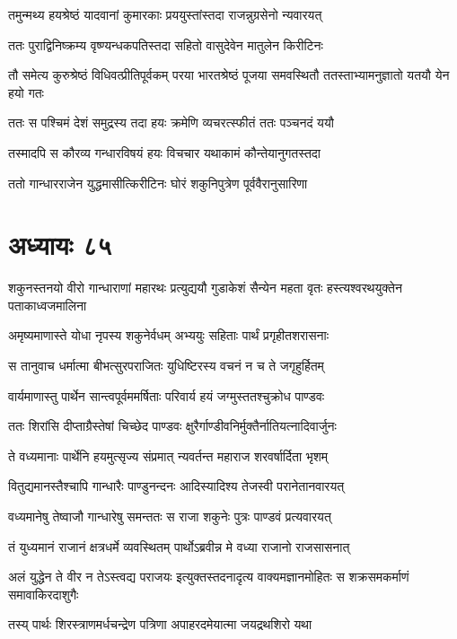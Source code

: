 \twolineshloka
{तमुन्मथ्य हयश्रेष्ठं यादवानां कुमारकाः}
{प्रययुस्तांस्तदा राजन्नुग्रसेनो न्यवारयत्}


\twolineshloka
{ततः पुराद्विनिष्क्रम्य वृष्ण्यन्धकपतिस्तदा}
{सहितो वासुदेवेन मातुलेन किरीटिनः}


\threelineshloka
{तौ समेत्य कुरुश्रेष्ठं विधिवत्प्रीतिपूर्वकम्}
{परया भारतश्रेष्ठं पूजया समवस्थितौ}
{ततस्ताभ्यामनुज्ञातो यतयौ येन हयो गतः}


\twolineshloka
{ततः स पश्चिमं देशं समुद्रस्य तदा हयः}
{क्रमेणि व्यचरत्स्फीतं ततः पञ्चनदं ययौ}


\twolineshloka
{तस्मादपि स कौरव्य गन्धारविषयं हयः}
{विचचार यथाकामं कौन्तेयानुगतस्तदा}


\twolineshloka
{ततो गान्धारराजेन युद्धमासीत्किरीटिनः}
{घोरं शकुनिपुत्रेण पूर्ववैरानुसारिणा}


\chapter{अध्यायः ८५}
\threelineshloka
{शकुनस्तनयो वीरो गान्धाराणां महारथः}
{प्रत्युद्ययौ गुडाकेशं सैन्येन महता वृतः}
{हस्त्यश्वरथयुक्तेन पताकाध्वजमालिना}


\twolineshloka
{अमृष्यमाणास्ते योधा नृपस्य शकुनेर्वधम्}
{अभ्ययुः सहिताः पार्थं प्रगृहीतशरासनाः}


\twolineshloka
{स तानुवाच धर्मात्मा बीभत्सुरपराजितः}
{युधिष्टिरस्य वचनं न च ते जगृहुर्हितम्}


\twolineshloka
{वार्यमाणास्तु पार्थेन सान्त्वपूर्वममर्षिताः}
{परिवार्य हयं जग्मुस्ततश्चुक्रोध पाण्डवः}


\twolineshloka
{ततः शिरांसि दीप्ताग्रैस्तेषां चिच्छेद पाण्डवः}
{क्षुरैर्गाण्डीवनिर्मुक्तैर्नातियत्नादिवार्जुनः}


\twolineshloka
{ते वध्यमानाः पार्थेनि हयमुत्सृज्य संप्रमात्}
{न्यवर्तन्त महाराज शरवर्षार्दिता भृशम्}


\twolineshloka
{वितुद्यमानस्तैश्चापि गान्धारैः पाण्डुनन्दनः}
{आदिस्यादिश्य तेजस्वी परानेतानवारयत्}


\twolineshloka
{वध्यमानेषु तेष्वाजौ गान्धारेषु समन्ततः}
{स राजा शकुनेः पुत्रः पाण्डवं प्रत्यवारयत्}


\twolineshloka
{तं युध्यमानं राजानं क्षत्रधर्मे व्यवस्थितम्}
{पार्थोऽब्रवीन्न मे वध्या राजानो राजसासनात्}


\threelineshloka
{अलं युद्धेन ते वीर न तेऽस्त्वद्य पराजयः}
{इत्युक्तस्तदनादृत्य वाक्यमज्ञानमोहितः}
{स शक्रसमकर्माणं समावाकिरदाशुगैः}


\twolineshloka
{तस्य् पार्थः शिरस्त्राणमर्धचन्द्रेण पत्रिणा}
{अपाहरदमेयात्मा जयद्रथशिरो यथा}



